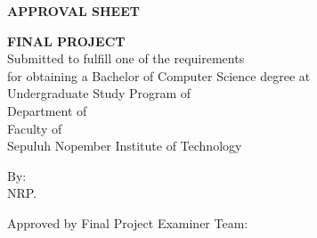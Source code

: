 \begin{center}
  \large
  \textbf{APPROVAL SHEET}
\end{center}

\thispagestyle{empty}

\begin{center}
  \textbf{\engtatitle{}}
\end{center}

\begingroup
\small

\begin{center}
  \textbf{FINAL PROJECT}
  \\Submitted to fulfill one of the requirements \\
  for obtaining a Bachelor of Computer Science degree at \\
  Undergraduate Study Program of \engstudyprogram{} \\
  Department of \engdepartment{} \\
  Faculty of \engfaculty{} \\
  Sepuluh Nopember Institute of Technology
\end{center}

\begin{center}
  By: \textbf{\name{}}
  \\NRP. \nrp{}
\end{center}

\begin{center}
  Approved by Final Project Examiner Team:
\end{center}

\begingroup
\setlength{\tabcolsep}{0pt}

